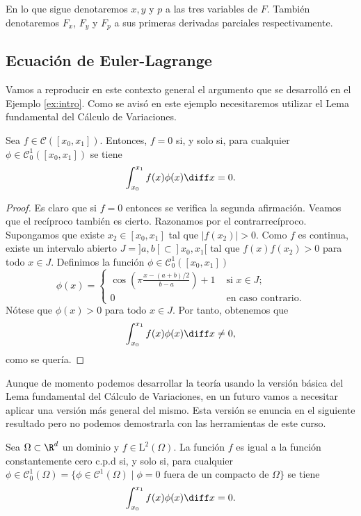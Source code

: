 \documentclass{article}
\begin{document}
En lo que sigue denotaremos $x,y$ y $p$ a las tres variables de $F$. También denotaremos $F_x$,
$F_y$ y $F_p$ a sus primeras derivadas parciales respectivamente.

\subsection{Ecuación de Euler-Lagrange}

Vamos a reproducir en este contexto general el argumento que se desarrolló en el Ejemplo
\ref{ex:intro}. Como se avisó en este ejemplo necesitaremos utilizar el Lema fundamental del Cálculo
de Variaciones.

\begin{thm}
  Sea $f \in \mathcal{C}([x_0, x_1])$. Entonces, $f = 0$ si, y solo si, para cualquier
  $\phi \in \mathcal{C}^1_0([x_0, x_1])$ se tiene
  \[\int_{x_0}^{x_1} f(x) \phi(x) \diff x = 0.\]
\end{thm}
\begin{proof}
  Es claro que si $f = 0$ entonces se verifica la segunda afirmación. Veamos que el recíproco
  también es cierto. Razonamos por el contrarrecíproco. Supongamos que existe $x_2 \in [x_0, x_1]$
  tal que $|f(x_2)| > 0$. Como $f$ es continua, existe un intervalo abierto
  $J = ]a,b[ \subset ]x_0, x_1[$ tal que $f(x)f(x_2) > 0$ para todo $x \in J$. Definimos la función
  $\phi \in \mathcal{C}^1_0([x_0, x_1])$
  \[ \phi(x) = \begin{cases} \cos\left(\pi\frac{x-(a+b)/2}{b-a}\right) + 1 & \text{ si } x \in J; \\
      0 & \text{ en caso contrario}.\end{cases}\] Nótese que $\phi(x) > 0$ para todo $x \in J$. Por
  tanto, obtenemos que
  \[\int_{x_0}^{x_1} f(x) \phi(x) \diff x \ne 0,\]
  como se quería.
\end{proof}

Aunque de momento podemos desarrollar la teoría usando la versión básica del Lema fundamental del
Cálculo de Variaciones, en un futuro vamos a necesitar aplicar una versión más general del
mismo. Esta versión se enuncia en el siguiente resultado pero no podemos demostrarla con las
herramientas de este curso.

\begin{theorem}
  \label{thm:fundamental-variaciones}
  Sea $\Omega \subset \R^d$ un dominio y $f \in \mathrm{L}^2(\Omega)$. La función $f$ es igual a la
  función constantemente cero c.p.d si, y solo si, para cualquier
  $\phi \in \mathcal{C}^1_0(\Omega) = \{ \phi \in \mathcal{C}^1(\Omega) \mid \phi = 0 \text{ fuera
    de un compacto de }\Omega\}$ se tiene
  \[\int_{x_0}^{x_1} f(x) \phi(x) \diff x = 0.\]
\end{theorem}
\end{document}
